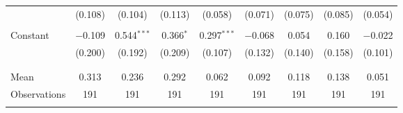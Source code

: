 \begin{tabular}{@{\extracolsep{5pt}}lcccccccc}
  & (0.108) & (0.104) & (0.113) & (0.058) & (0.071) & (0.075) & (0.085) & (0.054) \\ 
  & & & & & & & & \\ 
 Constant & $-$0.109 & 0.544$^{***}$ & 0.366$^{*}$ & 0.297$^{***}$ & $-$0.068 & 0.054 & 0.160 & $-$0.022 \\ 
  & (0.200) & (0.192) & (0.209) & (0.107) & (0.132) & (0.140) & (0.158) & (0.101) \\ 
  & & & & & & & & \\ 
\hline \\[-1.8ex] 
Mean & 0.313 & 0.236 & 0.292 & 0.062 & 0.092 & 0.118 & 0.138 & 0.051 \\ 
Observations & 191 & 191 & 191 & 191 & 191 & 191 & 191 & 191 \\ 
\hline 
\hline \\[-1.8ex] 
\end{tabular} 
